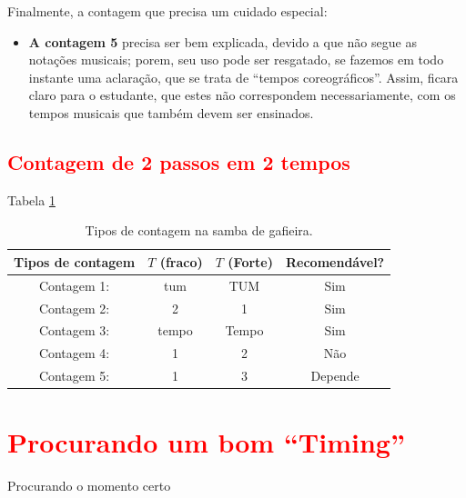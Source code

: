 Finalmente, a contagem que precisa um cuidado especial:
\begin{itemize}

\item \textbf{A contagem 5} precisa ser bem explicada, 
devido a que não segue as notações musicais; porem, seu uso pode ser resgatado,
se fazemos em todo instante uma aclaração, que se trata de ``tempos coreográficos''.
Assim, ficara claro para o estudante, que estes não correspondem necessariamente, 
com os tempos musicais que também devem ser ensinados.

\end{itemize}

\subsection{\textcolor{red}{Contagem de 2 passos em 2 tempos}}


Tabela \ref{tab:ritmoconta2}

\begin{table}[ht]
  \centering
  \begin{tabular}    {c|cc|c}
    \hline
    Tipos de contagem       & $T$ (fraco)  & $T$ (Forte)& Recomendável?\\
    \hline
    Contagem 1: & tum  & TUM  & Sim\\
    Contagem 2: & 2     & 1     & Sim\\
    Contagem 3: & tempo & Tempo & Sim\\ \hline
    Contagem 4: & 1     & 2     & Não\\ \hline
    Contagem 5: & 1     & 3     & Depende\\  \hline
    \hline
  \end{tabular}
  \caption{Tipos de contagem na samba de gafieira.}
\label{tab:ritmoconta2}
\end{table}

\section{\textcolor{red}{Procurando um bom ``Timing''}}
Procurando o momento certo

